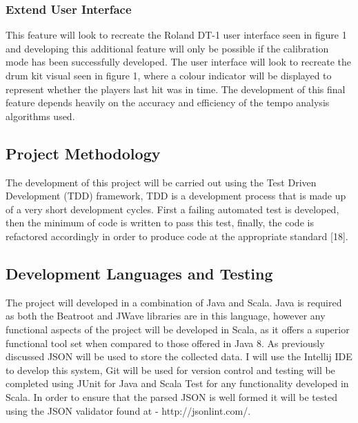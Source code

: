 \documentclass[a4paper, 11pt]{article}
\begin{document}
\subsubsection{Extend User Interface}
This feature will look to recreate the Roland DT-1 user interface seen in figure 1 and developing this additional feature will only be possible if the calibration mode has been successfully developed. The user interface will look to recreate the drum kit visual seen in figure 1, where a colour indicator will be displayed to represent whether the players last hit was in time. The development of this final feature depends heavily on the accuracy and efficiency of the tempo analysis algorithms used.

\subsection{Project Methodology}
The development of this project will be carried out using the Test Driven Development (TDD) framework, TDD is a development process that is made up of a very short development cycles. First a failing automated test is developed, then the minimum of code is written to pass this test, finally, the code is refactored accordingly in order to produce code at the appropriate standard [18].

\subsection{Development Languages and Testing}
The project will developed in a combination of Java and Scala. Java is required as both the Beatroot and JWave libraries are in this language, however any functional aspects of the project will be developed in Scala, as it offers a superior functional tool set when compared to those offered in Java 8. As previously discussed JSON will be used to store the collected data.
I will use the Intellij IDE to develop this system, Git will be used for version control and testing will be completed using JUnit for Java and Scala Test for any functionality developed in Scala. In order to ensure that the parsed JSON is well formed it will be tested using the JSON validator found at - http://jsonlint.com/.

\clearpage
\maketitle{} 
\end{document}
